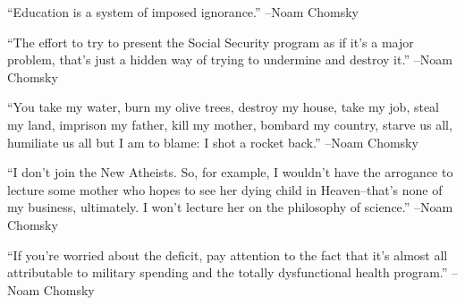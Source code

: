 \documentclass{article}%
\begin{document}
\vspace{1mm}%
\begin{minipage}{\textwidth}%
\flushleft%
“Education is a system of imposed ignorance.”%
\linebreak%
\vspace{1mm}%
–Noam Chomsky%
\linebreak%
\vspace{1mm}%
\end{minipage}%
\linebreak%
\vspace{1mm}%
\begin{minipage}{\textwidth}%
\flushleft%
“The effort to try to present the Social Security program as if it's a major problem, that's just a hidden way of trying to undermine and destroy it.”%
\linebreak%
\vspace{1mm}%
–Noam Chomsky%
\linebreak%
\vspace{1mm}%
\end{minipage}%
\linebreak%
\vspace{1mm}%
\begin{minipage}{\textwidth}%
\flushleft%
“You take my water, burn my olive trees, destroy my house, take my job, steal my land, imprison my father, kill my mother, bombard my country, starve us all, humiliate us all but I am to blame: I shot a rocket back.”%
\linebreak%
\vspace{1mm}%
–Noam Chomsky%
\linebreak%
\vspace{1mm}%
\end{minipage}%
\linebreak%
\vspace{1mm}%
\begin{minipage}{\textwidth}%
\flushleft%
“I don't join the New Atheists. So, for example, I wouldn't have the arrogance to lecture some mother who hopes to see her dying child in Heaven–that's none of my business, ultimately. I won't lecture her on the philosophy of science.”%
\linebreak%
\vspace{1mm}%
–Noam Chomsky%
\linebreak%
\vspace{1mm}%
\end{minipage}%
\linebreak%
\vspace{1mm}%
\begin{minipage}{\textwidth}%
\flushleft%
“If you're worried about the deficit, pay attention to the fact that it's almost all attributable to military spending and the totally dysfunctional health program.”%
\linebreak%
\vspace{1mm}%
–Noam Chomsky%
\linebreak%
\vspace{1mm}%
\end{minipage}%
\end{document}
